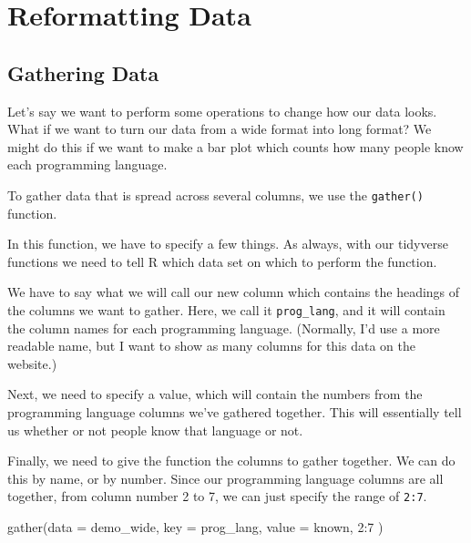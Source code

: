 \documentclass[
]{book}
\newenvironment{Shaded}{\begin{snugshade}}{\end{snugshade}}
\newcommand{\AttributeTok}[1]{\textcolor[rgb]{0.77,0.63,0.00}{#1}}
\newcommand{\DecValTok}[1]{\textcolor[rgb]{0.00,0.00,0.81}{#1}}
\newcommand{\FunctionTok}[1]{\textcolor[rgb]{0.00,0.00,0.00}{#1}}
\newcommand{\NormalTok}[1]{#1}
\newcommand{\SpecialCharTok}[1]{\textcolor[rgb]{0.00,0.00,0.00}{#1}}
\begin{document}
\hypertarget{reformatting-data}{%
\section{Reformatting Data}\label{reformatting-data}}

\hypertarget{gathering-data}{%
\subsection{Gathering Data}\label{gathering-data}}

Let's say we want to perform some operations to change how our data looks. What if we want to turn our data from a wide format into long format? We might do this if we want to make a bar plot which counts how many people know each programming language.

To gather data that is spread across several columns, we use the \texttt{gather()} function.

In this function, we have to specify a few things. As always, with our tidyverse functions we need to tell R which data set on which to perform the function.

We have to say what we will call our new column which contains the headings of the columns we want to gather. Here, we call it \texttt{prog\_lang}, and it will contain the column names for each programming language. (Normally, I'd use a more readable name, but I want to show as many columns for this data on the website.)

Next, we need to specify a value, which will contain the numbers from the programming language columns we've gathered together. This will essentially tell us whether or not people know that language or not.

Finally, we need to give the function the columns to gather together. We can do this by name, or by number. Since our programming language columns are all together, from column number 2 to 7, we can just specify the range of \texttt{2:7}.

\begin{Shaded}
\begin{Highlighting}[]
\FunctionTok{gather}\NormalTok{(}\AttributeTok{data =}\NormalTok{ demo\_wide,}
       \AttributeTok{key =}\NormalTok{ prog\_lang,}
       \AttributeTok{value =}\NormalTok{ known,}
       \DecValTok{2}\SpecialCharTok{:}\DecValTok{7}
\NormalTok{       )}
\end{Highlighting}
\end{Shaded}
\end{document}
